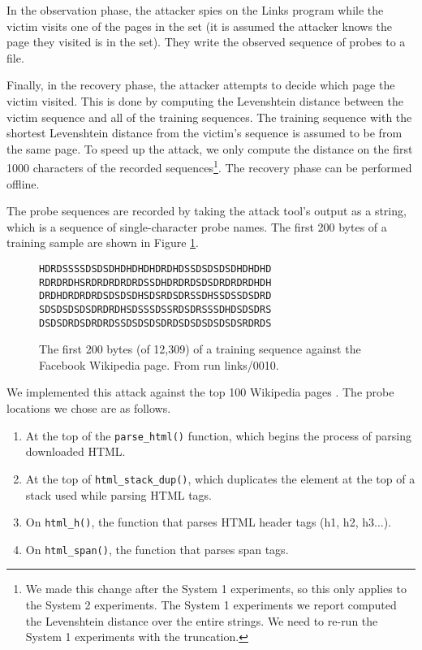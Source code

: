 \documentclass[letterpaper,twocolumn,10pt]{article}
\begin{document}
In the observation phase, the attacker spies on the Links program while the
victim visits one of the pages in the set (it is assumed the attacker knows the
page they visited is in the set). They write the observed sequence of probes to
a file.

Finally, in the recovery phase, the attacker attempts to decide which page the
victim visited. This is done by computing the Levenshtein distance
\cite{levenshtein1966binary} between the victim sequence and all of the training
sequences. The training sequence with the shortest Levenshtein distance from the
victim's sequence is assumed to be from the same page. To speed up the attack,
we only compute the distance on the first 1000 characters of the recorded
sequences\footnote{We made this change after the System 1 experiments, so this
only applies to the System 2 experiments. The System 1 experiments we report
computed the Levenshtein distance over the entire strings. We need to re-run the
System 1 experiments with the truncation.}. The recovery phase can be performed
offline.

The probe sequences are recorded by taking the attack tool's output as a string,
which is a sequence of single-character probe names. The first 200 bytes of
a training sample are shown in Figure \ref{figure:probetext}.

\begin{figure}
    \centering
\begin{verbatim}
HDRDSSSSDSDSDHDHDHDHDRDHDSSDSDSDSDHDHDHD
RDRDRDHSRDRDRDRDRDSSDHDRDRDSDSDRDRDRDHDH
DRDHDRDRDRDSDSDSDHSDSRDSDRSSDHSSDSSDSDRD
SDSDSDSDSDRDRDHSDSSSDSSRDSDRSSSDHDSDSDRS
DSDSDRDSDRDRDSSDSDSDSDRDSDSDSDSDSDSRDRDS
\end{verbatim}
\caption{The first 200 bytes (of 12,309) of a training sequence against the
Facebook Wikipedia page. From run links/0010.}
    \label{figure:probetext}
\end{figure}

We implemented this attack against the top 100 Wikipedia pages
\cite{wikitop2013}. The probe locations we chose are as follows.

\begin{enumerate}
    \item At the top of the \texttt{parse\_html()} function, which begins the
        process of parsing downloaded HTML.
    \item At the top of \texttt{html\_stack\_dup()}, which duplicates the element
        at the top of a stack used while parsing HTML tags.
    \item On \texttt{html\_h()}, the function that parses HTML header tags (h1,
        h2, h3...).
    \item On \texttt{html\_span()}, the function that parses span tags.
\end{enumerate}
\end{document}

